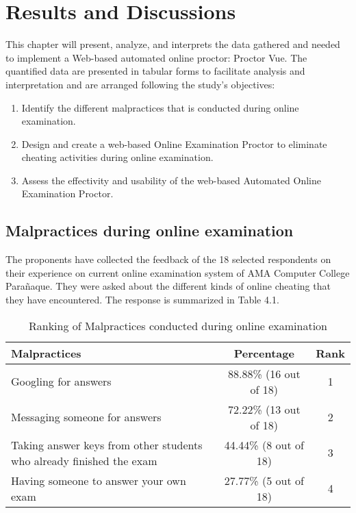 \chapter{Results and Discussions}

This chapter will present, analyze, and interprets the data gathered and needed to implement a Web-based automated online proctor: Proctor Vue.
The quantified data are presented in tabular forms to facilitate analysis and interpretation and are arranged following the study's objectives:

\begin{enumerate}
   \item Identify the different malpractices that is conducted during online examination.
   \item Design and create a web-based Online Examination Proctor to eliminate cheating activities during online examination.
   \item Assess the effectivity and usability of the web-based Automated Online Examination Proctor.
\end{enumerate}

\section{Malpractices during online examination}

The proponents have collected the feedback of the 18 selected respondents on their experience on current online examination system of AMA Computer College Parañaque.
They were asked about the different kinds of online cheating that they have encountered.
The response is summarized in Table 4.1.

\pagebreak

\begin{table}[h!]
   \begin{center}
      \begin{tabular}{|m{20em}|c|c|}
         \hline
         \textbf{Malpractices}                                                & \textbf{Percentage}    & \textbf{Rank} \\
         \hline
         Googling for answers                                                 & 88.88\% (16 out of 18) & 1             \\
         \hline
         Messaging someone for answers                                        & 72.22\% (13 out of 18) & 2             \\
         \hline
         Taking answer keys from other students who already finished the exam & 44.44\% (8 out of 18)  & 3             \\
         \hline
         Having someone to answer your own exam                               & 27.77\% (5 out of 18)  & 4             \\
         \hline
      \end{tabular}
   \end{center}
   \caption{Ranking of Malpractices conducted during online examination}
\end{table}

